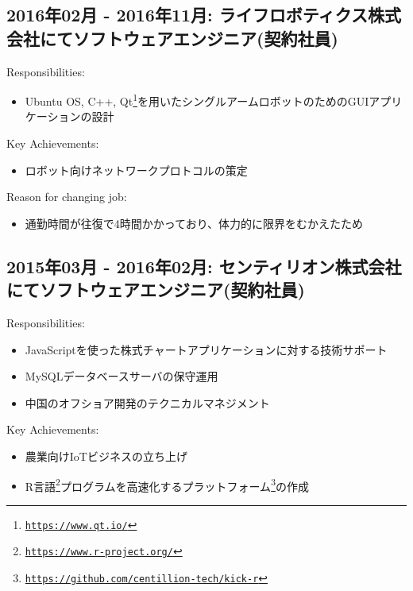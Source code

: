 \documentclass[letterpaper]{article}
\begin{document}
\subsection*{2016年02月 - 2016年11月: ライフロボティクス株式会社にてソフトウェアエンジニア(契約社員)}

\noindent Responsibilities:

\begin{itemize}
  \item Ubuntu OS, C++, Qt\footnote{\href{https://www.qt.io/}{\tt https://www.qt.io/}}を用いたシングルアームロボットのためのGUIアプリケーションの設計
\end{itemize}

\noindent Key Achievements:

\begin{itemize}
  \item ロボット向けネットワークプロトコルの策定
\end{itemize}

\noindent Reason for changing job:

\begin{itemize}
  \item 通勤時間が往復で4時間かかっており、体力的に限界をむかえたため
\end{itemize}

\subsection*{2015年03月 - 2016年02月: センティリオン株式会社にてソフトウェアエンジニア(契約社員)}

\noindent Responsibilities:

\begin{itemize}
  \item JavaScriptを使った株式チャートアプリケーションに対する技術サポート
  \item MySQLデータベースサーバの保守運用
  \item 中国のオフショア開発のテクニカルマネジメント
\end{itemize}

\noindent Key Achievements:

\begin{itemize}
  \item 農業向けIoTビジネスの立ち上げ
  \item R言語\footnote{\href{https://www.r-project.org/}{\tt https://www.r-project.org/}}プログラムを高速化するプラットフォーム\footnote{\href{https://github.com/centillion-tech/kick-r}{\tt https://github.com/centillion-tech/kick-r}}の作成
\end{itemize}
\end{document}
